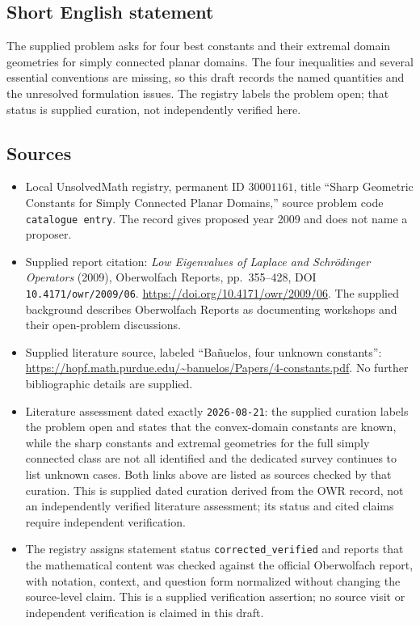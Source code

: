 \documentclass[11pt]{article}
\begin{document}
\subsection{Short English statement}
The supplied problem asks for four best constants and their extremal domain geometries for simply connected planar domains. The four inequalities and several essential conventions are missing, so this draft records the named quantities and the unresolved formulation issues. The registry labels the problem open; that status is supplied curation, not independently verified here.
\subsection{Sources}
\begin{itemize}
\item Local UnsolvedMath registry, permanent ID \(30001161\), title ``Sharp Geometric Constants for Simply Connected Planar Domains,'' source problem code \texttt{catalogue entry}. The record gives proposed year 2009 and does not name a proposer.
\item Supplied report citation: \emph{Low Eigenvalues of Laplace and Schrödinger Operators} (2009), Oberwolfach Reports, pp.~355--428, DOI \texttt{10.4171/owr/2009/06}. \url{https://doi.org/10.4171/owr/2009/06}. The supplied background describes Oberwolfach Reports as documenting workshops and their open-problem discussions.
\item Supplied literature source, labeled ``Bañuelos, four unknown constants'': \url{https://hopf.math.purdue.edu/~banuelos/Papers/4-constants.pdf}. No further bibliographic details are supplied.
\item Literature assessment dated exactly \texttt{2026-08-21}: the supplied curation labels the problem open and states that the convex-domain constants are known, while the sharp constants and extremal geometries for the full simply connected class are not all identified and the dedicated survey continues to list unknown cases. Both links above are listed as sources checked by that curation. This is supplied dated curation derived from the OWR record, not an independently verified literature assessment; its status and cited claims require independent verification.
\item The registry assigns statement status \texttt{corrected\_verified} and reports that the mathematical content was checked against the official Oberwolfach report, with notation, context, and question form normalized without changing the source-level claim. This is a supplied verification assertion; no source visit or independent verification is claimed in this draft.
\end{itemize}
\end{document}
